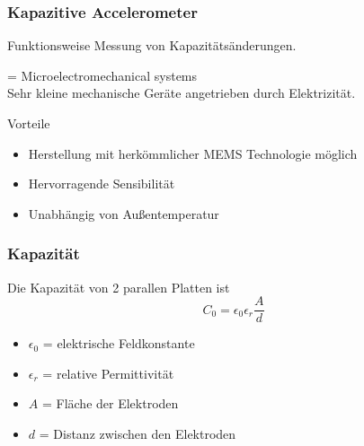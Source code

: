 \documentclass[10pt,a4paper,oneside]{beamer}
\begin{document}
\begin{frame}
	\frametitle{Kapazitive Accelerometer}
	\begin{block}{Funktionsweise}
		Messung von Kapazitätsänderungen.
	\end{block}
 	\begin{definition}[MEMS]
  	= Microelectromechanical systems \\
  	Sehr kleine mechanische Geräte angetrieben durch Elektrizität.
  	\end{definition}
    \bigskip
   
	Vorteile
 	\begin{itemize}
 		\item Herstellung mit herkömmlicher MEMS Technologie möglich
 		\item Hervorragende Sensibilität
		\item Unabhängig von Außentemperatur
 	\end{itemize}
\end{frame}

\begin{frame}
	\frametitle{Kapazität}
	Die Kapazität von 2 parallen Platten ist \cite{AM08}
	\begin{equation}
		C_{0} = \epsilon_{0} \epsilon_{r} \frac{A}{d}
	\end{equation}
	\begin{itemize}
		\item $\epsilon_{0}$ = elektrische Feldkonstante
		\item $\epsilon_{r}$ = relative Permittivität
		\item $A$ = Fläche der Elektroden
		\item $d$ = Distanz zwischen den Elektroden
	\end{itemize}

\end{frame}
\end{document}
